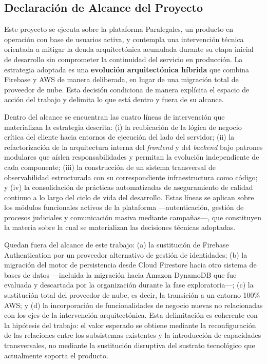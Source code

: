 \subsection{Declaración de Alcance del Proyecto}

Este proyecto se ejecuta sobre la plataforma Paralegales, un producto en operación con base de usuarios activa, y contempla una intervención técnica orientada a mitigar la deuda arquitectónica acumulada durante su etapa inicial de desarrollo sin comprometer la continuidad del servicio en producción. La estrategia adoptada es una \textbf{evolución arquitectónica híbrida} que combina Firebase y AWS de manera deliberada, en lugar de una migración total de proveedor de nube. Esta decisión condiciona de manera explícita el espacio de acción del trabajo y delimita lo que está dentro y fuera de su alcance.

Dentro del alcance se encuentran las cuatro líneas de intervención que materializan la estrategia descrita: (i) la reubicación de la lógica de negocio crítica del cliente hacia entornos de ejecución del lado del servidor; (ii) la refactorización de la arquitectura interna del \textit{frontend} y del \textit{backend} bajo patrones modulares que aíslen responsabilidades y permitan la evolución independiente de cada componente; (iii) la construcción de un sistema transversal de observabilidad estructurada con su correspondiente infraestructura como código; y (iv) la consolidación de prácticas automatizadas de aseguramiento de calidad continuo a lo largo del ciclo de vida del desarrollo. Estas líneas se aplican sobre los módulos funcionales activos de la plataforma —autenticación, gestión de procesos judiciales y comunicación masiva mediante campañas—, que constituyen la materia sobre la cual se materializan las decisiones técnicas adoptadas.

Quedan fuera del alcance de este trabajo: (a) la sustitución de Firebase Authentication por un proveedor alternativo de gestión de identidades; (b) la migración del motor de persistencia desde Cloud Firestore hacia otro sistema de bases de datos —incluida la migración hacia Amazon DynamoDB que fue evaluada y descartada por la organización durante la fase exploratoria—; (c) la sustitución total del proveedor de nube, es decir, la transición a un entorno 100\% AWS; y (d) la incorporación de funcionalidades de negocio nuevas no relacionadas con los ejes de la intervención arquitectónica. Esta delimitación es coherente con la hipótesis del trabajo: el valor esperado se obtiene mediante la reconfiguración de las relaciones entre los subsistemas existentes y la introducción de capacidades transversales, no mediante la sustitución disruptiva del sustrato tecnológico que actualmente soporta el producto.
